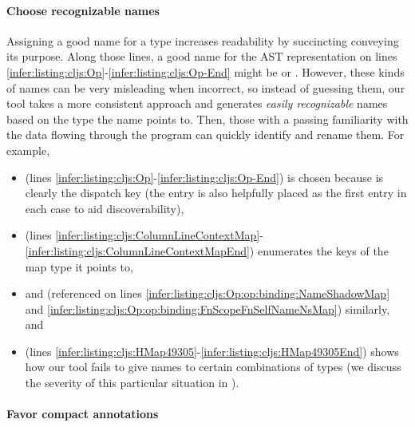 \paragraph{Choose recognizable names}
Assigning a good name for a type increases
readability by succincting conveying its purpose.
Along those lines, a good name for the AST representation
on lines \ref{infer:listing:cljs:Op}-\ref{infer:listing:cljs:Op-End}
might be  or .
However, these kinds of names can be very misleading when incorrect, so
instead of guessing them,
our tool takes a more consistent approach and generates \emph{easily recognizable}
names based on the type the name points to.
Then, those with a passing familiarity with the data flowing through the program
can quickly identify and rename them.
For example,
\begin{itemize}
  \item
     (lines \ref{infer:listing:cljs:Op}-\ref{infer:listing:cljs:Op-End})
    is chosen because  is
    clearly the dispatch key (the  entry is also helpfully placed
    as the first entry in each case to aid discoverability),
  \item
     (lines \ref{infer:listing:cljs:ColumnLineContextMap}-\ref{infer:listing:cljs:ColumnLineContextMapEnd})
    enumerates the keys of the map type it points to,
  \item
     and  (referenced on lines
    \ref{infer:listing:cljs:Op:op:binding:NameShadowMap} and \ref{infer:listing:cljs:Op:op:binding:FnScopeFnSelfNameNsMap})
    similarly, and
  \item
     (lines \ref{infer:listing:cljs:HMap49305}-\ref{infer:listing:cljs:HMap49305End})
    shows how our tool fails to give names to certain combinations
    of types (we discuss the severity of this particular situation in
    ).
\end{itemize}


\paragraph{Favor compact annotations}

